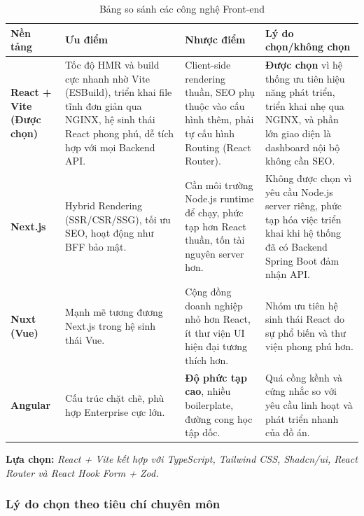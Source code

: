 \begin{table}[h!]
\centering
\setlength{\tabcolsep}{6pt}
\begin{tabularx}{\linewidth}{|>{\bfseries}l|>{\raggedright\arraybackslash}X|%
>{\raggedright\arraybackslash}X|%
>{\raggedright\arraybackslash}X|}
\hline
\textbf{Nền tảng} & \textbf{Ưu điểm} & \textbf{Nhược điểm} & \textbf{Lý do chọn/không chọn} \\
\hline
\textbf{React + Vite (Được chọn)} & Tốc độ HMR và build cực nhanh nhờ Vite (ESBuild), triển khai file tĩnh đơn giản qua NGINX, hệ sinh thái React phong phú, dễ tích hợp với mọi Backend API. & Client-side rendering thuần, SEO phụ thuộc vào cấu hình thêm, phải tự cấu hình Routing (React Router). & \textbf{Được chọn} vì hệ thống ưu tiên hiệu năng phát triển, triển khai nhẹ qua NGINX, và phần lớn giao diện là dashboard nội bộ không cần SEO. \\
\hline
Next.js & Hybrid Rendering (SSR/CSR/SSG), tối ưu SEO, hoạt động như BFF bảo mật. & Cần môi trường Node.js runtime để chạy, phức tạp hơn React thuần, tốn tài nguyên server hơn. & Không được chọn vì yêu cầu Node.js server riêng, phức tạp hóa việc triển khai khi hệ thống đã có Backend Spring Boot đảm nhận API. \\
\hline
Nuxt (Vue) & Mạnh mẽ tương đương Next.js trong hệ sinh thái Vue. & Cộng đồng doanh nghiệp nhỏ hơn React, ít thư viện UI hiện đại tương thích hơn. & Nhóm ưu tiên hệ sinh thái React do sự phổ biến và thư viện phong phú hơn. \\
\hline
Angular & Cấu trúc chặt chẽ, phù hợp Enterprise cực lớn. & \textbf{Độ phức tạp cao}, nhiều boilerplate, đường cong học tập dốc. & Quá cồng kềnh và cứng nhắc so với yêu cầu linh hoạt và phát triển nhanh của đồ án. \\
\hline
\end{tabularx}
\caption{Bảng so sánh các công nghệ Front-end}
\label{tab:frontend-compare}
\end{table}

\textbf{Lựa chọn:} \emph{React + Vite kết hợp với TypeScript, Tailwind CSS, Shadcn/ui, React Router và React Hook Form + Zod.}

\subsubsection*{Lý do chọn theo tiêu chí chuyên môn}


